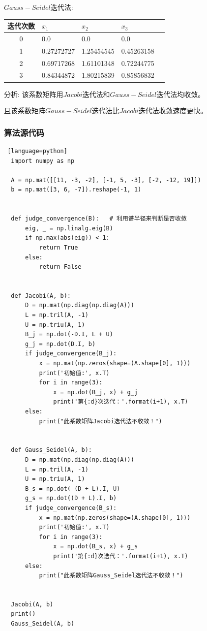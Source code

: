 \documentclass[UTF8]{ctexart}
\begin{document}
\quad

$Gauss-Seidel$迭代法:
\begin{table}[h]
    \vspace{20pt}
    \centering
    \begin{tabular}{cllll}
        \hline
        迭代次数 & $x_1$& $x_2$ & $x_3$\\
        \hline
        0  & 0.0          & 0.0             & 0.0           \\
        1  & 0.27272727   & 1.25454545      & 0.45263158    \\
        2  & 0.69717268   & 1.61101348      & 0.72244775    \\
        3  & 0.84344872   & 1.80215839      & 0.85856832    \\
        \hline       
    \end{tabular}
\end{table}

分析:
该系数矩阵用$Jacobi$迭代法和$Gauss-Seidel$迭代法均收敛。

且该系数矩阵$Gauss-Seidel$迭代法比$Jacobi$迭代法收敛速度更快。

\subsubsection{算法源代码}
\begin{lstlisting} [language=python]
  import numpy as np

  A = np.mat([[11, -3, -2], [-1, 5, -3], [-2, -12, 19]])
  b = np.mat([3, 6, -7]).reshape(-1, 1)
  
  
  def judge_convergence(B):   # 利用谱半径来判断是否收敛
      eig, _ = np.linalg.eig(B)
      if np.max(abs(eig)) < 1:
          return True
      else:
          return False
  
  
  def Jacobi(A, b):
      D = np.mat(np.diag(np.diag(A)))
      L = np.tril(A, -1)
      U = np.triu(A, 1)
      B_j = np.dot(-D.I, L + U)
      g_j = np.dot(D.I, b)
      if judge_convergence(B_j):
          x = np.mat(np.zeros(shape=(A.shape[0], 1)))
          print('初始值:', x.T)
          for i in range(3):
              x = np.dot(B_j, x) + g_j
              print('第{:d}次迭代：'.format(i+1), x.T)
      else:
          print("此系数矩阵Jacobi迭代法不收敛！")
  
  
  def Gauss_Seidel(A, b):
      D = np.mat(np.diag(np.diag(A)))
      L = np.tril(A, -1)
      U = np.triu(A, 1)
      B_s = np.dot(-(D + L).I, U)
      g_s = np.dot((D + L).I, b)
      if judge_convergence(B_s):
          x = np.mat(np.zeros(shape=(A.shape[0], 1)))
          print('初始值:', x.T)
          for i in range(3):
              x = np.dot(B_s, x) + g_s
              print('第{:d}次迭代：'.format(i+1), x.T)
      else:
          print("此系数矩阵Gauss_Seidel迭代法不收敛！")
  
  
  Jacobi(A, b)
  print()
  Gauss_Seidel(A, b)
\end{lstlisting}
\end{document}
